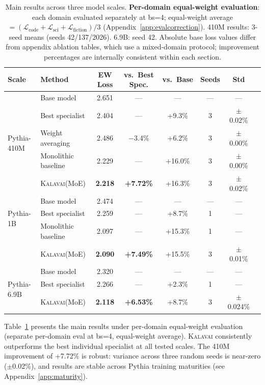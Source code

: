 \documentclass{article}
\newcommand{\kalavai}{\textsc{Kalavai}\xspace}
\begin{document}
\begin{table}[t]
\centering
\caption{Main results across three model scales. \textbf{Per-domain equal-weight evaluation}: each domain evaluated separately at bs=4; equal-weight average $= (\mathcal{L}_\text{code} + \mathcal{L}_\text{sci} + \mathcal{L}_\text{fiction})/3$ (Appendix~\ref{app:evalcorrection}). 410M results: 3-seed means (seeds 42/137/2026). 6.9B: seed 42. Absolute base loss values differ from appendix ablation tables, which use a mixed-domain protocol; improvement percentages are internally consistent within each section.}
\label{tab:main}
\begin{tabular}{llcccccc}
\toprule
\textbf{Scale} & \textbf{Method} & \textbf{EW Loss} & \textbf{vs.\ Best Spec.} & \textbf{vs.\ Base} & \textbf{Seeds} & \textbf{Std} \\
\midrule
\multirow{5}{*}{Pythia-410M}
 & Base model          & 2.651 & ---     & ---     & ---  & ---       \\
 & Best specialist     & 2.404 & ---     & +9.3\%  & 3    & $\pm$0.02\% \\
 & Weight averaging    & 2.486 & $-$3.4\% & +6.2\% & 3    & $\pm$0.00\% \\
 & Monolithic baseline & 2.229 & ---     & +16.0\% & 3    & $\pm$0.00\% \\
 & \kalavai (MoE)      & \textbf{2.218} & \textbf{+7.72\%} & +16.3\% & 3 & $\pm$0.02\% \\
\midrule
\multirow{3}{*}{Pythia-1B}
 & Base model          & 2.474 & ---     & ---     & ---  & ---        \\
 & Best specialist     & 2.259 & ---     & +8.7\%  & 1    & ---        \\
 & Monolithic baseline & 2.097 & ---     & +15.3\% & 1    & ---        \\
 & \kalavai (MoE)      & \textbf{2.090} & \textbf{+7.49\%} & +15.5\% & 3 & $\pm$0.01\% \\
\midrule
\multirow{3}{*}{Pythia-6.9B}
 & Base model          & 2.320 & ---     & ---     & ---  & ---        \\
 & Best specialist     & 2.266 & ---     & +2.3\%  & 1    & ---        \\
 & \kalavai (MoE)      & \textbf{2.118} & \textbf{+6.53\%} & +8.7\%  & 3 & $\pm$0.024\% \\
\bottomrule
\end{tabular}
\end{table}

Table~\ref{tab:main} presents the main results under per-domain equal-weight evaluation (separate per-domain eval at bs=4, equal-weight average). \kalavai consistently outperforms the best individual specialist at all tested scales. The 410M improvement of +7.72\% is robust: variance across three random seeds is near-zero ($\pm$0.02\%), and results are stable across Pythia training maturities (see Appendix~\ref{app:maturity}).
\end{document}
